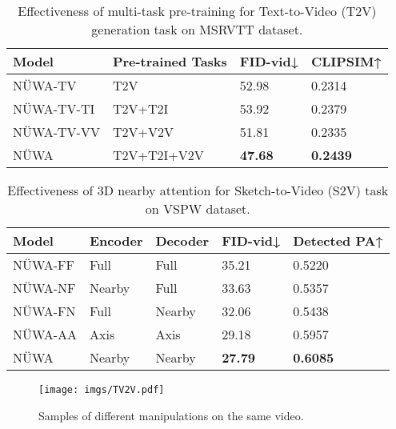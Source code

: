 \documentclass[10pt,twocolumn,letterpaper]{article}
\begin{document}
\begin{table}[t]
\footnotesize
\begin{center}
\caption{Effectiveness of multi-task pre-training for Text-to-Video (T2V) generation task on MSRVTT dataset.}
\label{tab:pipe}
\begin{tabular}{p{2cm}p{2cm}p{1.5cm}p{1.2cm}}
\toprule
Model  & Pre-trained Tasks & FID-vid↓  & CLIPSIM↑ \\
\midrule
NÜWA-TV   & T2V    &  52.98   &      0.2314      \\
NÜWA-TV-TI  & T2V+T2I    &  53.92   &  0.2379     \\    
NÜWA-TV-VV   & T2V+V2V    &  51.81   &  0.2335     \\    
NÜWA   & T2V+T2I+V2V   &    \textbf{47.68} &  \textbf{0.2439}  \\    
\bottomrule
\end{tabular}
\end{center}
\vspace{-6mm}
\end{table}
\begin{table}[t]
\footnotesize
\begin{center}
\caption{Effectiveness of 3D nearby attention for Sketch-to-Video (S2V) task on VSPW dataset.}
\label{tab:sparse}
\begin{tabular}{p{1.5cm}p{0.9cm}p{0.9cm}p{1.4cm}p{1.6cm}}
\toprule
Model         & Encoder & Decoder & FID-vid↓ & Detected PA↑ \\
\midrule
NÜWA-FF    & Full & Full &35.21 &   0.5220         \\
NÜWA-NF    & Nearby & Full &33.63 &   0.5357         \\
NÜWA-FN & Full & Nearby & 32.06 &    0.5438          \\
NÜWA-AA    & Axis & Axis &29.18  &  0.5957          \\
NÜWA          & Nearby & Nearby &\textbf{27.79} &   \textbf{0.6085}     \\
\bottomrule
\end{tabular}
\end{center}
\vspace{-6mm}
\end{table}


\begin{figure}[t]
	\centering
	\texttt{[image: imgs/TV2V.pdf]}
	\caption{Samples of different manipulations on the same video.}
	\label{fig:TV2V}
	\vspace{-6mm}
\end{figure}
\end{document}
